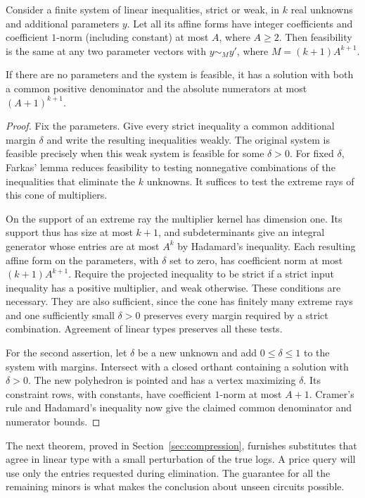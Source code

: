 \begin{lemma}[Projection]\label{lem:projection}
Consider a finite system of linear inequalities, strict or weak,
in \(k\) real unknowns and additional parameters \(y\).
Let all its affine forms have integer coefficients and
coefficient \(1\)-norm (including constant) at most \(A\), where \(A\ge2\).
Then feasibility is the same at any two parameter
vectors with \(y\sim_M y'\), where
\(M=(k+1) A^{k+1}\).

If there are no parameters and the system is feasible,
it has a solution with both a common positive denominator and the absolute
numerators at most \((A+1)^{k+1}\).
\end{lemma}
\begin{proof}
Fix the parameters. Give every strict inequality a common additional
margin \(\delta\) and write the resulting inequalities weakly. The
original system is feasible precisely when this weak system is
feasible for some \(\delta>0\). For fixed \(\delta\), Farkas' lemma
reduces feasibility to testing nonnegative combinations of the
inequalities that eliminate the \(k\) unknowns. It suffices to test
the extreme rays of this cone of multipliers.

On the support of an extreme ray the multiplier kernel has dimension
one. Its support thus has size at most \(k+1\), and subdeterminants
give an integral generator whose entries are at most \(A^k\) by
Hadamard's inequality. Each resulting affine form on the parameters,
with \(\delta\) set to zero, has coefficient norm at most
\((k+1)A^{k+1}\). Require the projected inequality to be strict if a
strict input inequality has a positive multiplier, and weak otherwise.
These conditions are necessary. They are also sufficient, since the
cone has finitely many extreme rays and one sufficiently small
\(\delta>0\) preserves every margin required by a strict combination.
Agreement of linear types preserves all these tests.

For the second assertion, let \(\delta\) be a new unknown and add
\(0\le\delta\le1\) to the system with margins. Intersect with a
closed orthant containing a solution with \(\delta>0\).
The new polyhedron is pointed and has a vertex maximizing \(\delta\).
Its constraint rows, with constants, have coefficient \(1\)-norm at
most \(A+1\). Cramer's rule and Hadamard's inequality now give the
claimed common denominator and numerator bounds.
\end{proof}

The next theorem, proved in Section~\ref{sec:compression}, furnishes
substitutes that agree in linear type with a small perturbation of
the true logs. A price query will use only the entries requested
during elimination. The guarantee for all the remaining minors is
what makes the conclusion about unseen circuits possible.

